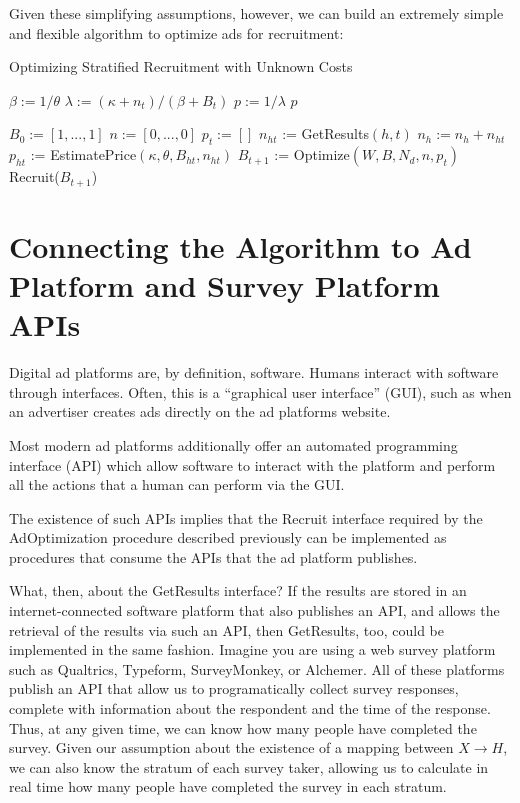 \documentclass[a4paper,12pt]{article}
\theoremstyle{proposition}
\begin{document}
Given these simplifying assumptions, however, we can build an extremely simple and flexible algorithm to optimize ads for recruitment:


\begin{algorithm}
\caption{Optimizing Stratified Recruitment with Unknown Costs}
\begin{algorithmic}
 
\State $\beta := 1 / \theta$
\State $\lambda := (\kappa + n_t) / (\beta + B_t) $
\State $p := 1 / \lambda $
\State \Return $p$
\EndProcedure

\State $B_0 := [1,...,1]$ 
\State $n := [0,...,0]$ 
  \State $p_t := []$ 
    \State $n_{ht}$ := GetResults$(h, t)$
    \State $n_h := n_h + n_{ht}$
    \State $p_{ht}$ := EstimatePrice$(\kappa, \theta, B_{ht}, n_{ht})$
  \EndFor
  \State $B_{t+1}$ := Optimize$(W, B, N_d, n, p_t)$
  \State Recruit($B_{t+1}$)
\EndFor
\EndProcedure
\end{algorithmic}
\end{algorithm}


\section{Connecting the Algorithm to Ad Platform and Survey Platform APIs}

Digital ad platforms are, by definition, software. Humans interact with software through interfaces. Often, this is a ``graphical user interface'' (GUI), such as when an advertiser creates ads directly on the ad platforms website.

Most modern ad platforms additionally offer an automated programming interface (API) which allow software to interact with the platform and perform all the actions that a human can perform via the GUI.

The existence of such APIs implies that the Recruit interface required by the AdOptimization procedure described previously can be implemented as procedures that consume the APIs that the ad platform publishes.

What, then, about the GetResults interface? If the results are stored in an internet-connected software platform that also publishes an API, and allows the retrieval of the results via such an API, then GetResults, too, could be implemented in the same fashion. Imagine you are using a web survey platform such as Qualtrics, Typeform, SurveyMonkey, or Alchemer. All of these platforms publish an API that allow us to programatically collect survey responses, complete with information about the respondent and the time of the response. Thus, at any given time, we can know how many people have completed the survey. Given our assumption about the existence of a mapping between $X \rightarrow H$, we can also know the stratum of each survey taker, allowing us to calculate in real time how many people have completed the survey in each stratum.
\end{document}

